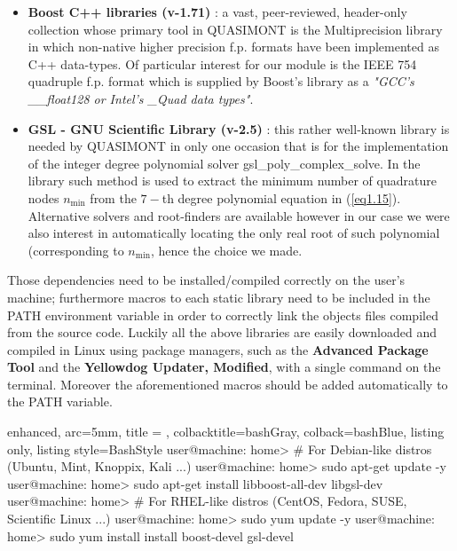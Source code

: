 \documentclass[a4paper, twosided]{book}
\begin{document}
\begin{itemize}
    \item \color{poliDarkBlue} \textbf{Boost C++ libraries (v-1.71)} \color{black}\cite{boost}: a vast, peer-reviewed, header-only collection whose primary tool in QUASIMONT is the \colorbox{poliGrayBlue}{Multiprecision} library in which non-native higher precision f.p. formats have been implemented as C++ data-types. Of particular interest for our module is the IEEE 754 quadruple f.p. format which is supplied by Boost's library as a {\itshape "GCC's \_\_float128 or Intel's \_Quad data types"}.
    \item \color{poliDarkBlue} \textbf{GSL - GNU Scientific Library (v-2.5)} \color{black}\cite{gsl}: this rather well-known library is needed by QUASIMONT in only one occasion that is for the implementation of the integer degree polynomial solver \colorbox{poliGrayBlue}{gsl\_poly\_complex\_solve}. In the library such method is used to extract the minimum number of quadrature nodes $n_{\text{min}}$ from the $7-$th degree polynomial equation in (\ref{eq1.15}). Alternative solvers and root-finders are available however in our case we were also interest in automatically locating the only real root of such polynomial (corresponding to $n_{\text{min}}$, hence the choice we made.
\end{itemize}

\noindent
Those dependencies need to be installed/compiled correctly on the user's machine; furthermore macros to each static library need to be included in the \colorbox{poliGrayBlue}{PATH} environment variable in order to correctly link the objects files compiled from the source code. Luckily all the above libraries are easily downloaded and compiled in Linux using package managers, such as the \color{poliDarkBlue} \textbf{Advanced Package Tool} \color{black} and the \color{poliDarkBlue} \textbf{Yellowdog Updater, Modified}\color{black}, with a single command on the terminal. Moreover the aforementioned macros should be added automatically to the \colorbox{poliGrayBlue}{PATH} variable.

\vspace{0.5cm}
\begin{tcblisting}{enhanced,
                   arc=5mm,
                   title = \color{black}{\large \ttfamily Installation of third-party libraries},
                   colbacktitle=bashGray,
                   colback=bashBlue,
                   listing only,
                   listing style=BashStyle}
user@machine: home> # For Debian-like distros (Ubuntu, Mint, Knoppix, Kali ...)
user@machine: home> sudo apt-get update -y
user@machine: home> sudo apt-get install libboost-all-dev libgsl-dev
user@machine: home> # For RHEL-like distros (CentOS, Fedora, SUSE, Scientific Linux ...)
user@machine: home> sudo yum update -y
user@machine: home> sudo yum install install boost-devel gsl-devel
\end{tcblisting}
\vspace{0.5cm}
\end{document}
